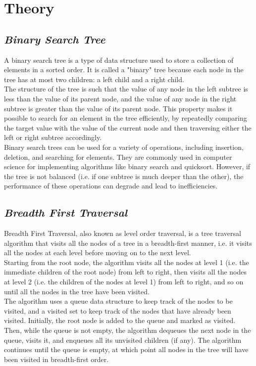 \documentclass{article}
\begin{document}
\section{\textbf{Theory}}
\subsection{\textbf{\textit{Binary Search Tree}}}
A binary search tree is a type of data structure used to store a collection of elements in a sorted order. It is called a "binary" tree because each node in the tree has at most two children: a left child and a right child.\\

The structure of the tree is such that the value of any node in the left subtree is less than the value of its parent node, and the value of any node in the right subtree is greater than the value of its parent node. This property makes it possible to search for an element in the tree efficiently, by repeatedly comparing the target value with the value of the current node and then traversing either the left or right subtree accordingly.\\

Binary search trees can be used for a variety of operations, including insertion, deletion, and searching for elements. They are commonly used in computer science for implementing algorithms like binary search and quicksort. However, if the tree is not balanced (i.e. if one subtree is much deeper than the other), the performance of these operations can degrade and lead to inefficiencies.
\subsection{\textbf{\textit{Breadth First Traversal}}}
Breadth First Traversal, also known as level order traversal, is a tree traversal algorithm that visits all the nodes of a tree in a breadth-first manner, i.e. it visits all the nodes at each level before moving on to the next level.\\

Starting from the root node, the algorithm visits all the nodes at level 1 (i.e. the immediate children of the root node) from left to right, then visits all the nodes at level 2 (i.e. the children of the nodes at level 1) from left to right, and so on until all the nodes in the tree have been visited.\\

The algorithm uses a queue data structure to keep track of the nodes to be visited, and a visited set to keep track of the nodes that have already been visited. Initially, the root node is added to the queue and marked as visited. Then, while the queue is not empty, the algorithm dequeues the next node in the queue, visits it, and enqueues all its unvisited children (if any). The algorithm continues until the queue is empty, at which point all nodes in the tree will have been visited in breadth-first order.\\
\end{document}
